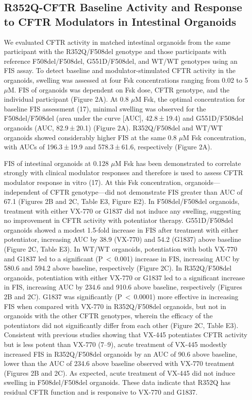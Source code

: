 \subsection{R352Q-CFTR Baseline Activity and Response to CFTR Modulators in Intestinal Organoids}

We evaluated CFTR activity in matched intestinal organoids from the same participant with the R352Q/F508del genotype and those participants with reference F508del/F508del, G551D/F508del, and WT/WT genotypes using an FIS assay. To detect baseline and modulator-stimulated CFTR activity in the organoids, swelling was assessed at four Fsk concentrations ranging from 0.02 to 5 $\mu$M. FIS of organoids was dependent on Fsk dose, CFTR genotype, and the individual participant (Figure 2A). At 0.8 $\mu$M Fsk, the optimal concentration for baseline FIS assessment (17), minimal swelling was observed for the F508del/F508del (area under the curve [AUC], 42.8 ± 19.4) and G551D/F508del organoids (AUC, 82.9 ± 20.1) (Figure 2A). R352Q/F508del and WT/WT organoids showed considerably higher FIS at the same 0.8 $\mu$M Fsk concentration, with AUCs of 196.3 ± 19.9 and 578.3 ± 61.6, respectively (Figure 2A).



FIS of intestinal organoids at 0.128 $\mu$M Fsk has been demonstrated to correlate strongly with clinical modulator responses and therefore is used to assess CFTR modulator response in vitro (17). At this Fsk concentration, organoids—independent of CFTR genotype—did not demonstrate FIS greater than AUC of 67.1 (Figures 2B and 2C, Table E3, Figure E2). In F508del/F508del organoids, treatment with either VX-770 or G1837 did not induce any swelling, suggesting no improvement in CFTR activity with potentiator therapy. G551D/F508del organoids showed a modest 1.5-fold increase in FIS after treatment with either potentiator, increasing AUC by 38.9 (VX-770) and 54.2 (G1837) above baseline (Figure 2C, Table E3). In WT/WT organoids, potentiation with both VX-770 and G1837 led to a significant (P $<$ 0.001) increase in FIS, increasing AUC by 580.6 and 594.2 above baseline, respectively (Figure 2C). In R352Q/F508del organoids, potentiation with either VX-770 or G1837 led to a significant increase in FIS, increasing AUC by 234.6 and 910.6 above baseline, respectively (Figures 2B and 2C). G1837 was significantly (P $<$ 0.0001) more effective in increasing FIS when compared with VX-770 in R352Q/F508del organoids, but not in organoids with the other CFTR genotypes, wherein the efficacy of the potentiators did not significantly differ from each other (Figure 2C, Table E3). Consistent with previous studies showing that VX-445 potentiates CFTR activity but is less potent than VX-770 (7–9), acute treatment of VX-445 modestly increased FIS in R352Q/F508del organoids by an AUC of 90.6 above baseline, lower than the AUC of 234.6 above baseline observed with VX-770 treatment (Figures 2B and 2C). As expected, acute treatment of VX-445 did not induce swelling in F508del/F508del organoids. These data indicate that R352Q has residual CFTR function and is responsive to VX-770 and G1837.

